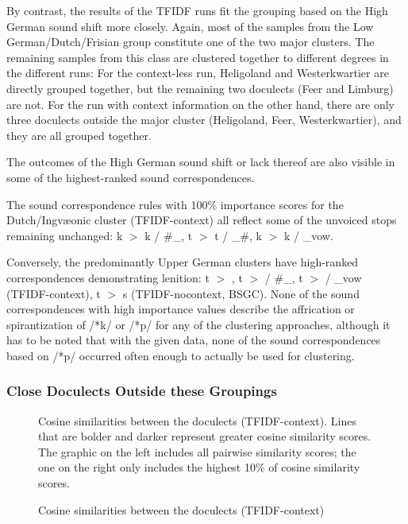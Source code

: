 \documentclass[a4paper]{article}
\begin{document}
By contrast, the results of the TFIDF runs fit
the grouping based on the High German sound shift more closely.
Again, most of the samples from the Low German/Dutch/Frisian group
constitute one of the two major clusters.
The remaining samples from this class are clustered together
to different degrees in the different runs:
For the context-less run,
Heligoland and Westerkwartier are directly grouped together,
but the remaining two doculects (Feer and Limburg) are not.
For the run with context information on the other hand,
there are only three doculects outside the major cluster
(Heligoland, Feer, Westerkwartier),
and they are all grouped together.

The outcomes of the High German sound shift or lack thereof
are also visible in some of the highest-ranked sound correspondences.

The sound correspondence rules with 100\% importance scores
for the Dutch/Ingv\ae{}onic cluster (TFIDF-context)
all reflect some of the unvoiced stops remaining unchanged:
k $>$ k / \#\_, t $>$ t / \_\#, k $>$ k / \_vow.

Conversely, the predominantly Upper German clusters
have high-ranked correspondences demonstrating lenition:
t $>$ , t $>$  / \#\_,
t $>$  / \_vow (TFIDF-context),
t $>$ s (TFIDF-nocontext, BSGC).
None of the sound correspondences with high importance values
describe the affrication or spirantization of /*k/ or /*p/
for any of the clustering approaches,
although it has to be noted that with the given data,
none of the sound correspondences based on /*p/
occurred often enough to actually be used for clustering.

\subsubsection{Close Doculects Outside these Groupings}

% 
\begin{figure}[h]
% 

\hspace{-4em}

\caption
{Cosine similarities between the doculects (TFIDF-context)}
{
Cosine similarities between the doculects (TFIDF-context).
Lines that are bolder and darker represent greater cosine similarity scores.
The graphic on the left includes all pairwise similarity scores;
the one on the right only includes the highest 10\% of cosine similarity scores.
}
\label{fig:cosine}
\end{figure}
\end{document}
